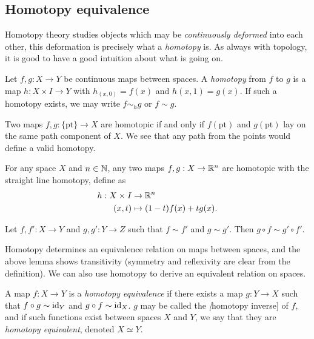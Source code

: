 \subsection{Homotopy equivalence}

Homotopy theory studies objects which may be \emph{continuously deformed} into each other, this deformation is precisely what a \emph{homotopy} is. As always with topology, it is good to have a good intuition about what is going on.

\begin{definition}[Homotopy]
	Let $f, g: X \to Y$ be continuous maps between spaces. A \emph{homotopy} from $f$ to $g$ is a map $h: X \times I \to Y$ with $h_(x, 0) = f(x)$ and $h(x,1)=g(x)$. If such a homotopy exists, we may write $f \sim_h g$ or $f \sim g$.
\end{definition}

\begin{example}
	Two maps $f, g: \{\text{pt}\} \to X$ are homotopic if and only if $f(\text{pt})$ and $g(\text{pt})$ lay on the same path component of $X$. We see that any path from the points would define a valid homotopy.
\end{example}

\begin{example}
	For any space $X$ and $n \in \mathbb{N}$, any two maps $f, g:X \to \mathbb{R}^n$ are homotopic with the straight line homotopy, define as
	\begin{align*}
		h: X \times I & \to \mathbb{R}^n                   \\
		(x,t)         & \mapsto (1-t)f(x) + tg(x).
	\end{align*}
\end{example}

\begin{lemma}
	Let $f, f': X \to Y$ and $g, g': Y \to Z$ such that $f \sim f'$ and $g \sim g'$. Then $g \circ f \sim g' \circ f'$.
\end{lemma}

Homotopy determines an equivalence relation on maps between spaces, and the above lemma shows transitivity (symmetry and reflexivity are clear from the definition). We can also use homotopy to derive an equivalent relation on spaces.

\begin{definition}
	A map $f: X \to Y$ is a \emph{homotopy equivalence} if there exists a map $g: Y \to X$ such that $f \circ g \sim \operatorname{id}_Y$ and $g \circ f \sim \operatorname{id}_X$. $g$ may be called the \emph[homotopy inverse] of $f$, and if such functions exist between spaces $X$ and $Y$, we say that they are \emph{homotopy equivalent}, denoted $X \simeq Y$.
\end{definition}

